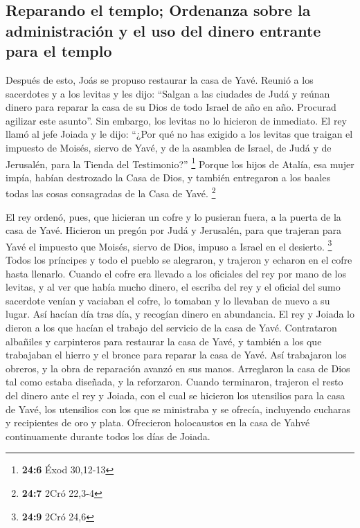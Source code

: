 \begin{paracol}{2}
\hypertarget{reparando-el-templo-ordenanza-sobre-la-administraciuxf3n-y-el-uso-del-dinero-entrante-para-el-templo}{%
\subsection{Reparando el templo; Ordenanza sobre la administración y el
uso del dinero entrante para el
templo}\label{reparando-el-templo-ordenanza-sobre-la-administraciuxf3n-y-el-uso-del-dinero-entrante-para-el-templo}}

 Después de esto, Joás se propuso restaurar la casa de
Yavé.  Reunió a los sacerdotes y a los levitas y les dijo:
``Salgan a las ciudades de Judá y reúnan dinero para reparar la casa de
su Dios de todo Israel de año en año. Procurad agilizar este asunto''.
Sin embargo, los levitas no lo hicieron de inmediato.  El
rey llamó al jefe Joiada y le dijo: ``¿Por qué no has exigido a los
levitas que traigan el impuesto de Moisés, siervo de Yavé, y de la
asamblea de Israel, de Judá y de Jerusalén, para la Tienda del
Testimonio?'' \footnote{\textbf{24:6} Éxod 30,12-13} 
Porque los hijos de Atalía, esa mujer impía, habían destrozado la Casa
de Dios, y también entregaron a los baales todas las cosas consagradas
de la Casa de Yavé. \footnote{\textbf{24:7} 2Cró 22,3-4}

 El rey ordenó, pues, que hicieran un cofre y lo pusieran
fuera, a la puerta de la casa de Yavé.  Hicieron un pregón
por Judá y Jerusalén, para que trajeran para Yavé el impuesto que
Moisés, siervo de Dios, impuso a Israel en el desierto. \footnote{\textbf{24:9}
  2Cró 24,6}  Todos los príncipes y todo el pueblo se
alegraron, y trajeron y echaron en el cofre hasta llenarlo.
 Cuando el cofre era llevado a los oficiales del rey por
mano de los levitas, y al ver que había mucho dinero, el escriba del rey
y el oficial del sumo sacerdote venían y vaciaban el cofre, lo tomaban y
lo llevaban de nuevo a su lugar. Así hacían día tras día, y recogían
dinero en abundancia.  El rey y Joiada lo dieron a los
que hacían el trabajo del servicio de la casa de Yavé. Contrataron
albañiles y carpinteros para restaurar la casa de Yavé, y también a los
que trabajaban el hierro y el bronce para reparar la casa de Yavé.
 Así trabajaron los obreros, y la obra de reparación
avanzó en sus manos. Arreglaron la casa de Dios tal como estaba
diseñada, y la reforzaron.  Cuando terminaron, trajeron
el resto del dinero ante el rey y Joiada, con el cual se hicieron los
utensilios para la casa de Yavé, los utensilios con los que se
ministraba y se ofrecía, incluyendo cucharas y recipientes de oro y
plata. Ofrecieron holocaustos en la casa de Yahvé continuamente durante
todos los días de Joiada.


\end{paracol}
